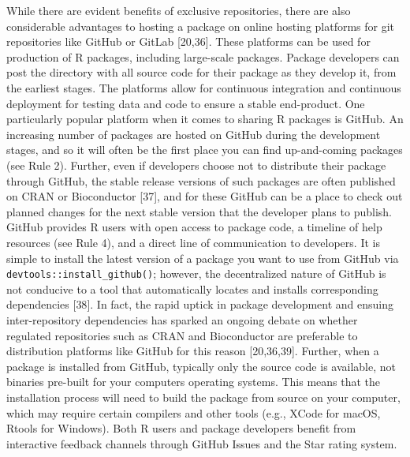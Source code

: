 \documentclass[10pt,letterpaper]{article}
\begin{document}
While there are evident benefits of exclusive repositories, there are
also considerable advantages to hosting a package on online hosting
platforms for git repositories like GitHub or GitLab {[}20,36{]}. These
platforms can be used for production of R packages, including
large-scale packages. Package developers can post the directory with all
source code for their package as they develop it, from the earliest
stages. The platforms allow for continuous integration and continuous
deployment for testing data and code to ensure a stable end-product. One
particularly popular platform when it comes to sharing R packages is
GitHub. An increasing number of packages are hosted on GitHub during the
development stages, and so it will often be the first place you can find
up-and-coming packages (see Rule 2). Further, even if developers choose
not to distribute their package through GitHub, the stable release
versions of such packages are often published on CRAN or Bioconductor
{[}37{]}, and for these GitHub can be a place to check out planned
changes for the next stable version that the developer plans to publish.
GitHub provides R users with open access to package code, a timeline of
help resources (see Rule 4), and a direct line of communication to
developers. It is simple to install the latest version of a package you
want to use from GitHub via \texttt{devtools::install\_github()};
however, the decentralized nature of GitHub is not conducive to a tool
that automatically locates and installs corresponding dependencies
{[}38{]}. In fact, the rapid uptick in package development and ensuing
inter-repository dependencies has sparked an ongoing debate on whether
regulated repositories such as CRAN and Bioconductor are preferable to
distribution platforms like GitHub for this reason {[}20,36,39{]}.
Further, when a package is installed from GitHub, typically only the
source code is available, not binaries pre-built for your computers
operating systems. This means that the installation process will need to
build the package from source on your computer, which may require
certain compilers and other tools (e.g., XCode for macOS, Rtools for
Windows). Both R users and package developers benefit from interactive
feedback channels through GitHub Issues and the Star rating system.
\end{document}
